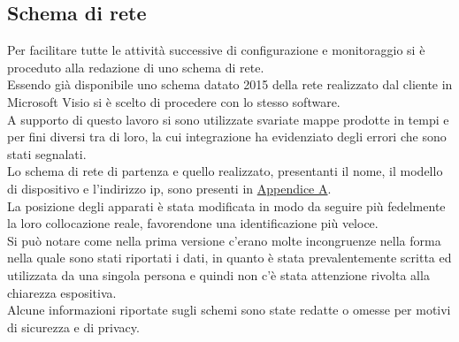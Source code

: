 \documentclass[Realizzazione.tex]{subfiles}
\begin{document}
\subsection{Schema di rete}
Per facilitare tutte le attività successive di configurazione e monitoraggio si è proceduto alla redazione di uno schema di rete. \\
Essendo già disponibile uno schema datato 2015 della rete realizzato dal cliente in Microsoft Visio si è scelto di procedere con lo stesso software. \\
A supporto di questo lavoro si sono utilizzate svariate mappe prodotte in tempi e per fini diversi tra di loro, la cui integrazione ha evidenziato degli errori che sono stati segnalati. \\
Lo schema di rete di partenza e quello realizzato, presentanti il nome, il modello di dispositivo e l'indirizzo ip, sono presenti in \hyperref[sec:Appendice A]{Appendice A}.\\
La posizione degli apparati è stata modificata in modo da seguire più fedelmente la loro collocazione reale, favorendone una identificazione più veloce. \\
Si può notare come nella prima versione c'erano molte incongruenze nella forma nella quale sono stati riportati i dati, in quanto è stata prevalentemente scritta ed utilizzata da una singola persona e quindi non c'è stata attenzione rivolta alla chiarezza espositiva. \\
Alcune informazioni riportate sugli schemi sono state redatte o omesse per motivi di sicurezza e di privacy. \\
\end{document}
